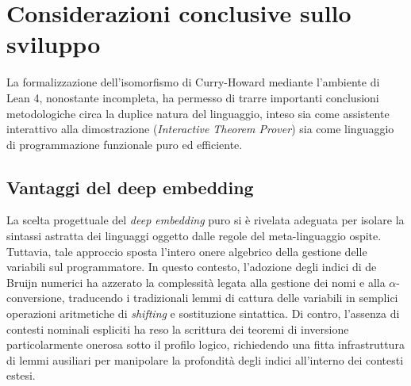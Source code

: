 \section{Considerazioni conclusive sullo sviluppo}
La formalizzazione dell'isomorfismo di Curry-Howard mediante l'ambiente di Lean 4, nonostante incompleta, ha permesso di trarre importanti conclusioni metodologiche circa la duplice natura del linguaggio, inteso sia come assistente interattivo alla dimostrazione 
(\emph{Interactive Theorem Prover}) sia come linguaggio di programmazione funzionale puro ed efficiente.

\subsection{Vantaggi del deep embedding}
La scelta progettuale del \emph{deep embedding} puro si è rivelata adeguata per isolare la sintassi astratta dei linguaggi oggetto dalle regole del meta-linguaggio ospite. Tuttavia, tale approccio sposta l'intero onere algebrico della gestione delle variabili 
sul programmatore. In questo contesto, l'adozione degli indici di de Bruijn numerici ha azzerato la complessità legata alla gestione dei nomi e alla $\alpha$-conversione, traducendo i tradizionali lemmi di cattura delle variabili in semplici operazioni aritmetiche 
di \emph{shifting} e sostituzione sintattica. Di contro, l'assenza di contesti nominali espliciti ha reso la scrittura dei teoremi di inversione particolarmente onerosa sotto il profilo logico, richiedendo una fitta infrastruttura di lemmi ausiliari per manipolare 
la profondità degli indici all'interno dei contesti estesi.

